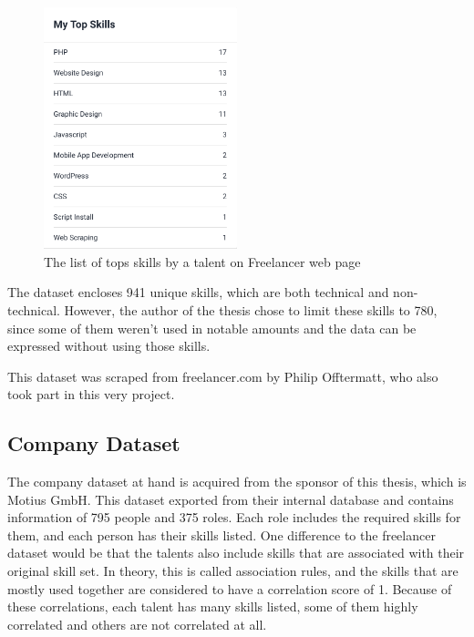 \begin{figure}[htp]
	\centering
	\includegraphics[width=0.5\textwidth]{figures/FreelancerTalentSkills.png}
	\caption{The list of tops skills by a talent on Freelancer web page}
	\label{fig:freelancer-talent-talent}
\end{figure}


The dataset encloses  941 unique skills, which are both technical and non-technical. However, the author of the thesis chose to limit these skills to 780, since some of them weren't used in notable amounts and the data can be expressed without using those skills.


This dataset was scraped from freelancer.com by Philip Offtermatt, who also took part in this very project.


\subsection{Company Dataset}\label{subsection:company-dataset}

The company dataset at hand is acquired from the sponsor of this thesis, which is Motius GmbH. This dataset exported from their internal database and contains information of 795 people and 375 roles. Each role includes the required skills for them, and each person has their skills listed. One difference to the freelancer dataset would be that the talents also include skills that are associated with their original skill set. In theory, this is called association rules, and the skills that are mostly used together are considered to have a correlation score of 1. Because of these correlations, each talent has many skills listed, some of them highly correlated and others are not correlated at all.


